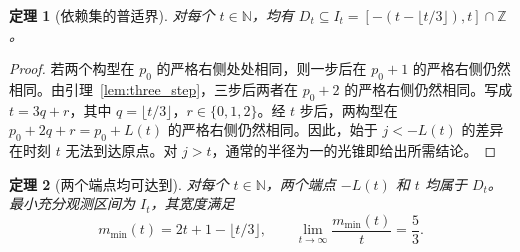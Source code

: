 \documentclass[11pt, a4paper]{article}
\newtheorem{theorem}{定理}[section]
\begin{document}
\begin{theorem}[依赖集的普适界]\label{thm:upper_bound}
对每个 $t \in \mathbb{N}$，均有 $D_t \subseteq I_t = [-(t - \lfloor t/3 \rfloor), t] \cap \mathbb{Z}$。
\end{theorem}

\begin{proof}
若两个构型在 $p_0$ 的严格右侧处处相同，则一步后在 $p_0 + 1$ 的严格右侧仍然相同。由引理~\ref{lem:three_step}，三步后两者在 $p_0 + 2$ 的严格右侧仍然相同。写成 $t = 3q + r$，其中 $q = \lfloor t/3 \rfloor$，$r \in \{0, 1, 2\}$。经 $t$ 步后，两构型在 $p_0 + 2q + r = p_0 + L(t)$ 的严格右侧仍然相同。因此，始于 $j < -L(t)$ 的差异在时刻 $t$ 无法到达原点。对 $j > t$，通常的半径为一的光锥即给出所需结论。
\end{proof}

\begin{theorem}[两个端点均可达到]\label{thm:sharpness}
对每个 $t \in \mathbb{N}$，两个端点 $-L(t)$ 和 $t$ 均属于 $D_t$。最小充分观测区间为 $I_t$，其宽度满足
\begin{equation}
m_{\min}(t) = 2t + 1 - \lfloor t/3 \rfloor, \qquad \lim_{t \to \infty} \frac{m_{\min}(t)}{t} = \frac{5}{3}.
\end{equation}
\end{theorem}
\end{document}
